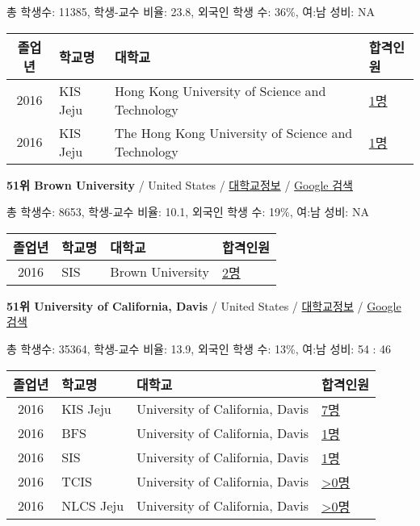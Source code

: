 \documentclass[13pt,]{article}
\begin{document}
총 학생수: 11385, 학생-교수 비율: 23.8, 외국인 학생 수: 36\%, 여:남
성비: NA

\begin{longtable}[]{@{}clll@{}}
\toprule
졸업년 & 학교명 & 대학교 & 합격인원\tabularnewline
\midrule
\endhead
2016 & KIS Jeju & Hong Kong University of Science and Technology &
\href{http://cafe.naver.com/assarabia/11596}{1명}\tabularnewline
2016 & KIS Jeju & The Hong Kong University of Science and Technology &
\href{http://cafe.naver.com/assarabia/11596}{1명}\tabularnewline
\bottomrule
\end{longtable}

\textbf{51위 Brown University} / United States /
\href{https://www.timeshighereducation.com/world-university-rankings/brown-university?ranking-dataset=589595}{대학교정보}
/ \href{http://www.google.com/search?q=Brown+University}{Google 검색}

총 학생수: 8653, 학생-교수 비율: 10.1, 외국인 학생 수: 19\%, 여:남 성비:
NA

\begin{longtable}[]{@{}clll@{}}
\toprule
졸업년 & 학교명 & 대학교 & 합격인원\tabularnewline
\midrule
\endhead
2016 & SIS & Brown University &
\href{http://cafe.naver.com/assarabia/11589}{2명}\tabularnewline
\bottomrule
\end{longtable}

\textbf{51위 University of California, Davis} / United States /
\href{https://www.timeshighereducation.com/world-university-rankings/university-of-california-davis?ranking-dataset=589595}{대학교정보}
/
\href{http://www.google.com/search?q=University+of+California,+Davis}{Google
검색}

총 학생수: 35364, 학생-교수 비율: 13.9, 외국인 학생 수: 13\%, 여:남
성비: 54 : 46

\begin{longtable}[]{@{}clll@{}}
\toprule
졸업년 & 학교명 & 대학교 & 합격인원\tabularnewline
\midrule
\endhead
2016 & KIS Jeju & University of California, Davis &
\href{http://cafe.naver.com/assarabia/11596}{7명}\tabularnewline
2016 & BFS & University of California, Davis &
\href{http://cafe.naver.com/assarabia/11597}{1명}\tabularnewline
2016 & SIS & University of California, Davis &
\href{http://cafe.naver.com/assarabia/11589}{1명}\tabularnewline
2016 & TCIS & University of California, Davis &
\href{http://cafe.naver.com/assarabia/11598}{\textgreater{}0명}\tabularnewline
2016 & NLCS Jeju & University of California, Davis &
\href{http://cafe.naver.com/assarabia/11592}{\textgreater{}0명}\tabularnewline
\bottomrule
\end{longtable}
\end{document}

